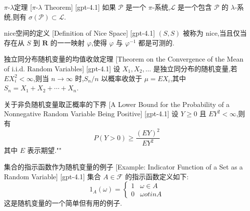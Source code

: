 \documentclass[UTF8]{ctexart}
\begin{document}
    
    
    \begin{thm}
        {$\pi$-$\lambda$定理}
        [$\pi$-$\lambda$ Theorem]
        [gpt-4.1]
        如果 $\mathcal{P}$ 是一个 $\pi$-系统,$\mathcal{L}$ 是一个包含 $\mathcal{P}$ 的 $\lambda$-系统,则有 $\sigma(\mathcal{P}) \subset \mathcal{L}$.
    \end{thm}
    
    
    
    \begin{dfn}
        {nice空间的定义}
        [Definition of Nice Space]
        [gpt-4.1]
        $(S, S)$ 被称为 nice,当且仅当存在从 $S$ 到 $\mathbf{R}$ 的一一映射 $\varphi$,使得 $\varphi$ 与 $\varphi^{-1}$ 都是可测的.
    \end{dfn}
    
    
    
    \begin{thm}
        {独立同分布随机变量的均值收敛定理}
        [Theorem on the Convergence of the Mean of i.i.d. Random Variables]
        [gpt-4.1]
        设 $X_1, X_2, \dots$ 是独立同分布的随机变量,若 $E X_i^2 < \infty$,则当 $n \to \infty$ 时,$S_n / n$ 以概率收敛于 $\mu = E X_i$,其中 $S_n = X_1 + X_2 + \cdots + X_n$.
    \end{thm}
    
    
    
    \begin{thm}
        {关于非负随机变量取正概率的下界}
        [A Lower Bound for the Probability of a Nonnegative Random Variable Being Positive]
        [gpt-4.1]
        设 $Y \geq 0$ 且 $E Y^2 < \infty$,则有
\[
P(Y > 0) \geq \frac{(E Y)^2}{E Y^2}
\]
其中 $E$ 表示期望.""

    \end{thm}
    
    
    
    \begin{xmp}
        {集合的指示函数作为随机变量的例子}
        [Example: Indicator Function of a Set as a Random Variable]
        [gpt-4.1]
        集合 $A \in {\mathcal{F}}$ 的指示函数定义如下:
\[
1_{A}(\omega) = \left\{
\begin{array}{ll}
1 & \omega \in A \\
0 & \omega 
otin A
\end{array}
\right.
\]
这是随机变量的一个简单但有用的例子.

    \end{xmp}
    
\end{document}
